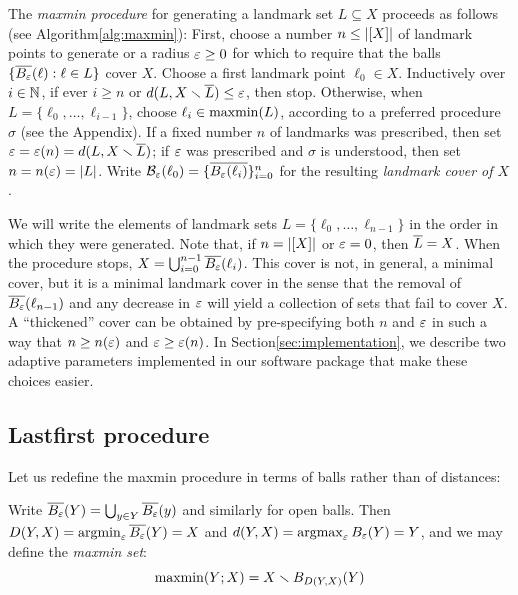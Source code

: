\documentclass[
]{article}
\begin{document}
The \emph{maxmin procedure} for generating a landmark set
\(L\subseteq X\) proceeds as follows (see
Algorithm\nbs\ref{alg:maxmin}): First, choose a number \(n\leq\lvert [X]\rvert\)
of landmark points to generate or a radius \(\varepsilon\geq 0\) for which to
require that the balls \(\{ \overline{B_{\varepsilon}}(\ell) : \ell \in L \}\) cover
\(X\). Choose a first landmark point \(\ell_0\in X\). Inductively over
\(i\in\mathbb{N}\), if ever \(i\geq n\) or \(d(L,X\smallsetminus \overline{L})\leq\varepsilon\), then
stop. Otherwise, when \(L=\{\ell_0,\ldots,\ell_{i-1}\}\), choose
\(\ell_i\in\operatorname{maxmin}(L)\), according to a preferred procedure \(\sigma\)
(see the Appendix). If a fixed number \(n\) of landmarks was prescribed,
then set \(\varepsilon=\varepsilon(n)=d(L,X\smallsetminus \overline{L})\); if \(\varepsilon\) was prescribed
and \(\sigma\) is understood, then set \(n=n(\varepsilon)=\lvert L\rvert\). Write
\(\mathcal{B}_\varepsilon(\ell_0)=\{\overline{B_{\varepsilon}(\ell_i)}\}_{i=0}^{n}\) for the
resulting \emph{landmark cover of $X$}.

We will write the elements of landmark sets
\(L=\{\ell_0,\ldots,\ell_{n-1}\}\) in the order in which they were
generated. Note that, if \(n=\lvert [X]\rvert\) or \(\varepsilon=0\), then
\(\overline{L}=X\). When the procedure stops,
\(X=\bigcup_{i=0}^{n-1}{\overline{B_{\varepsilon}}(\ell_i)}\). This cover is not, in
general, a minimal cover, but it is a minimal landmark cover in the
sense that the removal of \(\overline{B_\varepsilon}(\ell_{n-1})\) and any decrease
in \(\varepsilon\) will yield a collection of sets that fail to cover \(X\). A
``thickened'' cover can be obtained by pre-specifying both \(n\) and
\(\varepsilon\) in such a way that \(n \geq n(\varepsilon)\) and
\(\varepsilon \geq \varepsilon(n)\). In Section\nbs\ref{sec:implementation}, we
describe two adaptive parameters implemented in our software package
that make these choices easier.

\hypertarget{lastfirst-procedure}{%
\subsection{Lastfirst procedure}\label{lastfirst-procedure}}

Let us redefine the maxmin procedure in terms of balls rather than of
distances:

\begin{definition}
Write $\overline{B_\varepsilon}(Y) = \bigcup_{y \in Y}{\overline{B_\varepsilon}(y)}$ and similarly for open balls. Then $D(Y,X) = \operatorname{argmin}_{\varepsilon}{\overline{B_\varepsilon}(Y) = X}$ and $d(Y,X) = \operatorname{argmax}_{\varepsilon}{B_\varepsilon(Y) = Y}$, and we may define the \emph{maxmin set}:
$$\operatorname{maxmin}(Y;X) = X \smallsetminus B_{D(Y,X)}(Y)$$
\end{definition}
\end{document}

